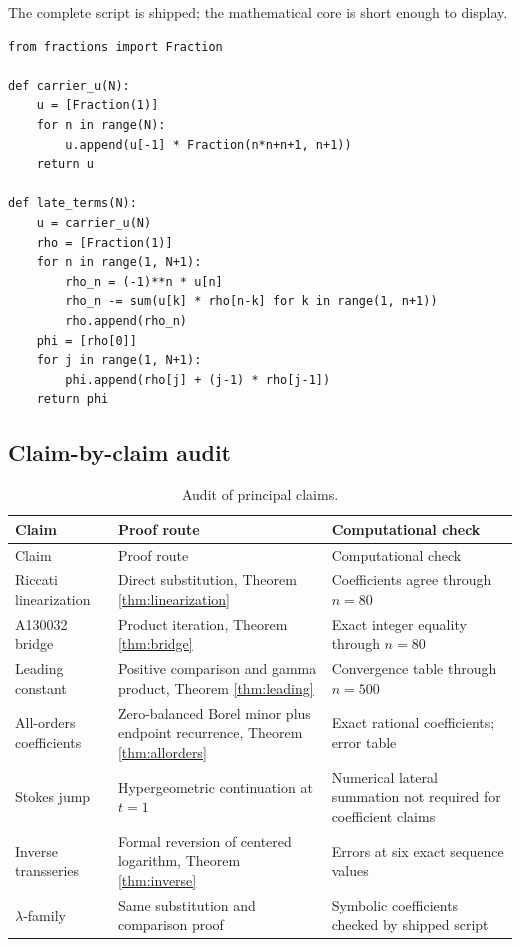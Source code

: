 \documentclass[11pt,a4paper]{article}
\theoremstyle{definition}
\theoremstyle{remark}
\begin{document}
The complete script is shipped; the mathematical core is short enough to display.

\begin{lstlisting}[style=pythonstyle,caption={Exact carrier and late-term recursions.}]
from fractions import Fraction

def carrier_u(N):
    u = [Fraction(1)]
    for n in range(N):
        u.append(u[-1] * Fraction(n*n+n+1, n+1))
    return u

def late_terms(N):
    u = carrier_u(N)
    rho = [Fraction(1)]
    for n in range(1, N+1):
        rho_n = (-1)**n * u[n]
        rho_n -= sum(u[k] * rho[n-k] for k in range(1, n+1))
        rho.append(rho_n)
    phi = [rho[0]]
    for j in range(1, N+1):
        phi.append(rho[j] + (j-1) * rho[j-1])
    return phi
\end{lstlisting}

\subsection{Claim-by-claim audit}

\begin{longtable}{p{}p{}p{}}
\caption{Audit of principal claims.}\label{tab:audit}\\
\toprule
Claim & Proof route & Computational check\\
\midrule
\endfirsthead
\toprule
Claim & Proof route & Computational check\\
\midrule
\endhead
Riccati linearization & Direct substitution, Theorem \ref{thm:linearization} & Coefficients agree through \(n=80\)\\
A130032 bridge & Product iteration, Theorem \ref{thm:bridge} & Exact integer equality through \(n=80\)\\
Leading constant & Positive comparison and gamma product, Theorem \ref{thm:leading} & Convergence table through \(n=500\)\\
All-orders coefficients & Zero-balanced Borel minor plus endpoint recurrence, Theorem \ref{thm:allorders} & Exact rational coefficients; error table\\
Stokes jump & Hypergeometric continuation at \(t=1\) & Numerical lateral summation not required for coefficient claims\\
Inverse transseries & Formal reversion of centered logarithm, Theorem \ref{thm:inverse} & Errors at six exact sequence values\\
\(\lambda\)-family & Same substitution and comparison proof & Symbolic coefficients checked by shipped script\\
\bottomrule
\end{longtable}
\end{document}
